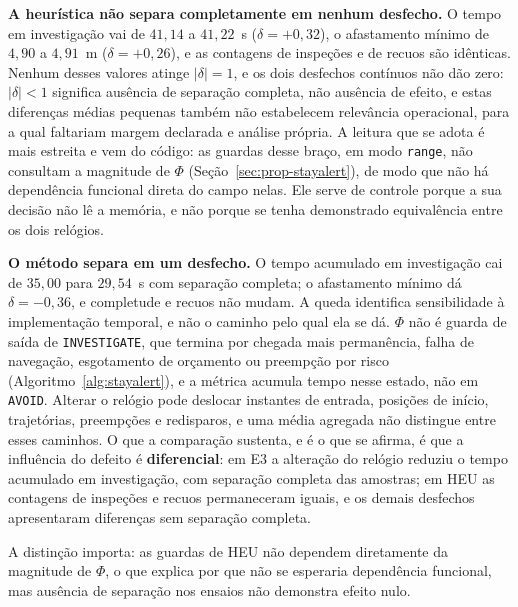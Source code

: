 \textbf{A heurística não separa completamente em nenhum desfecho.} O tempo em
investigação vai de
$41{,}14$ a $41{,}22$~s ($\delta=+0{,}32$), o afastamento mínimo de $4{,}90$ a $4{,}91$~m
($\delta=+0{,}26$), e as contagens de inspeções e de recuos são idênticas. Nenhum desses
valores atinge $|\delta|=1$, e os dois desfechos contínuos não dão zero: $|\delta|<1$
significa ausência de separação completa, não ausência de efeito, e estas diferenças
médias pequenas também não estabelecem relevância operacional, para a qual faltariam
margem declarada e análise própria. A leitura que se adota é mais estreita e vem do
código: as guardas desse braço, em modo \texttt{range}, não consultam a magnitude de
$\Phi$ (Seção~\ref{sec:prop-stayalert}), de modo que não há dependência funcional direta
do campo nelas. Ele serve de controle porque a sua decisão não lê a memória, e não porque
se tenha demonstrado equivalência entre os dois relógios.

\textbf{O método separa em um desfecho.} O tempo acumulado em investigação cai de
$35{,}00$ para $29{,}54$~s com separação completa; o afastamento mínimo dá
$\delta=-0{,}36$, e completude e recuos não mudam. A queda identifica sensibilidade à
implementação temporal, e não o caminho pelo qual ela se dá. $\Phi$ não é guarda de saída
de \texttt{INVESTIGATE}, que termina por chegada mais permanência, falha de navegação,
esgotamento de orçamento ou preempção por risco (Algoritmo~\ref{alg:stayalert}), e a
métrica acumula tempo nesse estado, não em \texttt{AVOID}. Alterar o relógio pode deslocar
instantes de entrada, posições de início, trajetórias, preempções e redisparos, e uma
média agregada não distingue entre esses caminhos. O que a comparação sustenta, e é o que
se afirma, é que a influência do defeito é \textbf{diferencial}: em E3 a alteração do
relógio reduziu o tempo acumulado em investigação, com separação completa das amostras;
em HEU as contagens de inspeções e recuos permaneceram iguais, e os demais desfechos
apresentaram diferenças sem separação completa.

A distinção importa: as guardas de HEU não dependem diretamente da
magnitude de $\Phi$, o que explica por que não se esperaria dependência funcional, mas
ausência de separação nos ensaios não demonstra efeito nulo.

